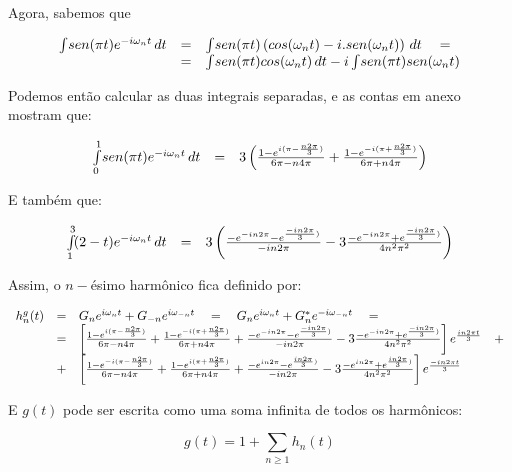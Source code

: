 Agora, sabemos que

\[\displaystyle
\begin{array}{l c l}
  \int \! sen(\pi t) e^{-i \omega_n t}\, dt & = & \int \! sen(\pi t) \left( cos(\omega_n t) -i.sen(\omega_n t) \right) \, dt \quad = \\
    & = &  \int \! sen(\pi t)cos(\omega_n t) \, dt -i\int \! sen(\pi t)sen(\omega_n t)
\end{array}
\]

Podemos então calcular as duas integrais separadas, e as contas em anexo mostram que:

\[\displaystyle
\begin{array}{l c l}
  \int\limits_0^1 \! sen(\pi t) e^{-i \omega_n t}\, dt & = & 3 \left( \frac{1-e^{i(\pi-\frac{n2\pi}{3})}}{6\pi - n4\pi} + \frac{1-e^{-i(\pi+\frac{n2\pi}{3})}}{6\pi + n4\pi} \right)
\end{array}
\]

E também que:

\[\displaystyle
\begin{array}{l c l}
  \int\limits_1^3 \! (2-t) e^{-i \omega_n t}\, dt & = & 3 \left( \frac{-e^{-in2\pi}-e^{\frac{-in2\pi}{3})}}{-in2\pi} - 3 \frac{-e^{-in2\pi}+e^{\frac{-in2\pi}{3})}}{4 n^2 \pi^2} \right)
\end{array}
\]

Assim, o $n-$ésimo harmônico fica definido por:

\[\displaystyle
\begin{array}{l c l}
  h_n^g(t) & = & G_n e^{i \omega_n t} + G_{-n} e^{i \omega_{-n} t} \quad = \quad G_n e^{i \omega_n t} + G_n^* e^{-i \omega_{-n} t} \quad = \\
         & = & \left[ \frac{1-e^{i(\pi-\frac{n2\pi}{3})}}{6\pi - n4\pi} + \frac{1-e^{-i(\pi+\frac{n2\pi}{3})}}{6\pi + n4\pi} + \frac{-e^{-in2\pi}-e^{\frac{-in2\pi}{3})}}{-in2\pi} - 3 \frac{-e^{-in2\pi}+e^{\frac{-in2\pi}{3})}}{4 n^2 \pi^2} \right] e^{\frac{i n 2 \pi t}{3}} \quad + \\
         & + & \left[ \frac{1-e^{-i(\pi-\frac{n2\pi}{3})}}{6\pi - n4\pi} + \frac{1-e^{i(\pi+\frac{n2\pi}{3})}}{6\pi + n4\pi} + \frac{-e^{in2\pi}-e^{\frac{in2\pi}{3})}}{-in2\pi} - 3 \frac{-e^{in2\pi}+e^{\frac{in2\pi}{3})}}{4 n^2 \pi^2} \right] e^{\frac{-i n 2 \pi t}{3}}
\end{array}
\]

E $g(t)$ pode ser escrita como uma soma infinita de todos os harmônicos:

\begin{equation}\displaystyle
  g(t) = 1+ \sum\limits_{n \ge 1} h_n(t)
  \label{eq:1b}
\end{equation}

